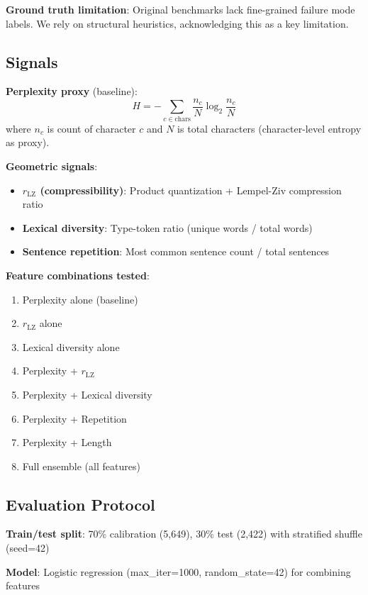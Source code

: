 \documentclass[11pt]{article}
\begin{document}
\textbf{Ground truth limitation}: Original benchmarks lack fine-grained failure mode labels. We rely on structural heuristics, acknowledging this as a key limitation.

\subsection{Signals}

\textbf{Perplexity proxy} (baseline):
\begin{equation}
H = -\sum_{c \in \text{chars}} \frac{n_c}{N} \log_2 \frac{n_c}{N}
\end{equation}
where $n_c$ is count of character $c$ and $N$ is total characters (character-level entropy as proxy).

\textbf{Geometric signals}:
\begin{itemize}
\item \textbf{$r_{\text{LZ}}$ (compressibility)}: Product quantization + Lempel-Ziv compression ratio
\item \textbf{Lexical diversity}: Type-token ratio (unique words / total words)
\item \textbf{Sentence repetition}: Most common sentence count / total sentences
\end{itemize}

\textbf{Feature combinations tested}:
\begin{enumerate}
\item Perplexity alone (baseline)
\item $r_{\text{LZ}}$ alone
\item Lexical diversity alone
\item Perplexity + $r_{\text{LZ}}$
\item Perplexity + Lexical diversity
\item Perplexity + Repetition
\item Perplexity + Length
\item Full ensemble (all features)
\end{enumerate}

\subsection{Evaluation Protocol}

\textbf{Train/test split}: 70\% calibration (5,649), 30\% test (2,422) with stratified shuffle (seed=42)

\textbf{Model}: Logistic regression (max\_iter=1000, random\_state=42) for combining features
\end{document}
